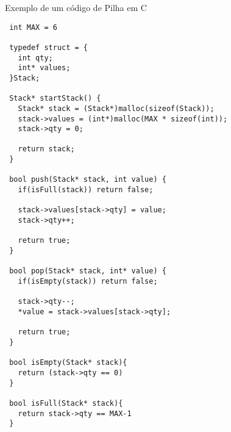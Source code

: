 \begin{listing}[H]
\label{code:stack}
\caption{Exemplo de um código de Pilha em C}
\begin{verbatim}
 int MAX = 6

 typedef struct = {
   int qty;
   int* values;
 }Stack;

 Stack* startStack() {
   Stack* stack = (Stack*)malloc(sizeof(Stack));
   stack->values = (int*)malloc(MAX * sizeof(int));
   stack->qty = 0;

   return stack;
 }

 bool push(Stack* stack, int value) {
   if(isFull(stack)) return false;

   stack->values[stack->qty] = value;
   stack->qty++;

   return true;
 }

 bool pop(Stack* stack, int* value) {
   if(isEmpty(stack)) return false;

   stack->qty--;
   *value = stack->values[stack->qty];

   return true;
 }

 bool isEmpty(Stack* stack){
   return (stack->qty == 0)
 }

 bool isFull(Stack* stack){
   return stack->qty == MAX-1
 }
\end{verbatim}
\end{listing}
